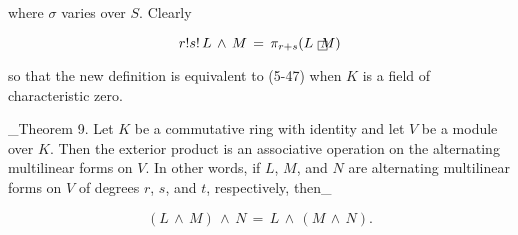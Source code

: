 where \(\sigma\) varies over \(S\). Clearly

\[r!s!\,L\,\wedge\,M\,=\,\pi_{r+s}(L\,\,\hbox to 0.0pt{\lower 2.15pt\hbox{\vbox{ \hrule height 0.4pt\hbox{\vrule width 0.4pt height 6.0pt\kern 6.0pt\vrule width 0.4pt}\hrule height 0.4pt}}}\,M)\]

so that the new definition is equivalent to (5-47) when \(K\) is a field of characteristic zero.

_Theorem 9. Let \(K\) be a commutative ring with identity and let \(V\) be a module over \(K\). Then the exterior product is an associative operation on the alternating multilinear forms on \(V\). In other words, if \(L\), \(M\), and \(N\) are alternating multilinear forms on \(V\) of degrees \(r\), \(s\), and \(t\), respectively, then_

\[(L\,\wedge\,M)\,\wedge\,N\,=\,L\,\wedge\,(M\,\wedge\,N).\] 